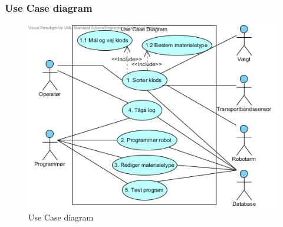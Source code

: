 \subsubsection{Use Case diagram}

\begin{figure}[h]
\centering
\includegraphics[scale=0.6]{Use_Cases/Diagrammer/Use_Case_Diagram.jpg} 
\caption{Use Case diagram}
\end{figure}
